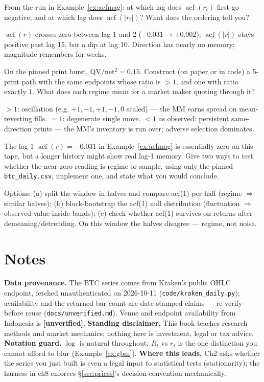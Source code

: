 \begin{exercise}[easy]
From the run in Example~\ref{ex:acfmag}: at which lag does
$\operatorname{acf}(r_t)$ first go negative, and at which lag does
$\operatorname{acf}(|r_t|)$? What does the ordering tell you?
\end{exercise}
\begin{solution}
$\operatorname{acf}(r)$ crosses zero between lag 1 and 2
($-0.031\to+0.002$); $\operatorname{acf}(|r|)$ stays positive past
lag 15, bar a dip at lag 10. Direction has nearly no memory; magnitude remembers for
weeks.
\end{solution}
\begin{exercise}[medium]
On the pinned print burst, QV/net$^2 = 0.15$. Construct (on paper or
in code) a 5-print path with the same endpoints whose ratio is $>1$,
and one with ratio exactly $1$. What does each regime mean for a
market maker quoting through it?
\end{exercise}
\begin{solution}
$>1$: oscillation (e.g. $+1,-1,+1,-1,0$ scaled) --- the MM earns
spread on mean-reverting fills. $=1$: degenerate single move. $<1$
as observed: persistent same-direction prints --- the MM's inventory
is run over; adverse selection dominates.
\end{solution}
\begin{exercise}[hard]
The lag-1 $\operatorname{acf}(r)=-0.031$ in
Example~\ref{ex:acfmag} is essentially zero on this tape, but a
longer history might show real lag-1 memory. Give two ways to test
whether the near-zero reading is regime or sample, using only the
pinned \texttt{btc\_daily.csv}, implement one, and state what you
would conclude.
\end{exercise}
\begin{solution}
Options: (a) split the window in halves and compare acf(1) per half
(regime $\Rightarrow$ similar halves); (b) block-bootstrap the acf(1)
null distribution (fluctuation $\Rightarrow$ observed value inside
bands); (c) check whether acf(1) survives on returns after
demeaning/detrending. On this window the halves disagree ---
regime, not noise.
\end{solution}

\section*{Notes}
\textbf{Data provenance.} The BTC series comes from Kraken's public
OHLC endpoint, fetched unauthenticated on 2026-10-11
(\texttt{code/kraken\_daily.py}); availability and the returned bar
count are date-stamped claims --- re-verify before reuse
(\texttt{docs/unverified.md}). Venue and endpoint availability from
Indonesia is \textbf{[unverified]}.
\textbf{Standing disclaimer.} This book teaches research methods and
market mechanics; nothing here is investment, legal or tax advice.
\textbf{Notation guard.} $\log$ is natural throughout; $R_t$ vs
$r_t$ is the one distinction you cannot afford to blur
(Example~\ref{ex:gbm}).
\textbf{Where this leads.} Ch2 asks whether the series you just
built is even a legal input to statistical tests (stationarity);
the harness in ch8 enforces \S\ref{sec:prices}'s decision
convention mechanically.

